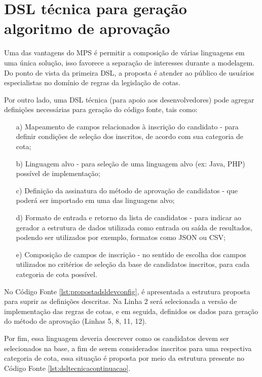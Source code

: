 \section{DSL técnica para geração algoritmo de aprovação}
\label{sec:dslproposta:dev}

 Uma das vantagens do \gls{MPS} é permitir a composição de várias linguagens em uma única solução, isso favorece a separação de interesses durante a modelagem. Do ponto de vista da primeira \gls{DSL}, a proposta é atender ao público de usuários especialistas no domínio de regras da legislação de cotas. 
 
 Por outro lado, uma \gls{DSL} técnica (para apoio aos desenvolvedores) pode agregar definições necessárias para geração do código fonte, tais como:
 
 \begin{enumerate}
     \item[a)] Mapeamento de campos relacionados à inscrição do candidato - para definir condições de seleção dos inscritos, de acordo com sua categoria de cota;
     \item[b)] Linguagem alvo - para seleção de uma linguagem alvo (ex: Java, PHP) possível de implementação;
     \item[c)] Definição da assinatura do método de aprovação de candidatos - que poderá ser importado em uma das linguagens alvo;
     \item[d)] Formato de entrada e retorno da lista de candidatos - para indicar ao gerador a estrutura de dados utilizada como entrada ou saída de resultados, podendo ser utilizados por exemplo, formatos como JSON ou CSV;
     \item[e)] Composição de campos de inscrição - no sentido de escolha dos campos utilizados no critérios de seleção da base de candidatos inscritos, para cada categoria de cota possível.
 \end{enumerate}
 
    No Código Fonte \ref{lst:propostadsldevconfig}, é apresentada a estrutura proposta para suprir as definições descritas. Na Linha 2 será selecionada a versão de implementação das regras de cotas, e em seguida, definidos os dados para geração do método de aprovação (Linhas 5, 8, 11, 12). 
    
    
 
 Por fim, essa linguagem deveria descrever como os candidatos devem ser selecionados na base, a fim de serem considerados inscritos para uma respectiva categoria de cota, essa situação é proposta por meio da estrutura presente no Código Fonte \ref{lst:dsltecnicacontinuacao}.
 
